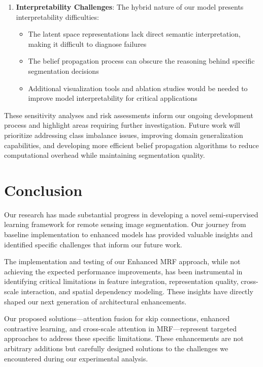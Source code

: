 \documentclass[conference]{IEEEtran}
\begin{document}
\begin{enumerate}
    \item \textbf{Interpretability Challenges}: The hybrid nature of our model presents interpretability difficulties:
    \begin{itemize}
        \item The latent space representations lack direct semantic interpretation, making it difficult to diagnose failures
        \item The belief propagation process can obscure the reasoning behind specific segmentation decisions
        \item Additional visualization tools and ablation studies would be needed to improve model interpretability for critical applications
    \end{itemize}
\end{enumerate}

These sensitivity analyses and risk assessments inform our ongoing development process and highlight areas requiring further investigation. Future work will prioritize addressing class imbalance issues, improving domain generalization capabilities, and developing more efficient belief propagation algorithms to reduce computational overhead while maintaining segmentation quality.

\section*{Conclusion}

Our research has made substantial progress in developing a novel semi-supervised learning framework for remote sensing image segmentation. Our journey from baseline implementation to enhanced models has provided valuable insights and identified specific challenges that inform our future work.

The implementation and testing of our Enhanced MRF approach, while not achieving the expected performance improvements, has been instrumental in identifying critical limitations in feature integration, representation quality, cross-scale interaction, and spatial dependency modeling. These insights have directly shaped our next generation of architectural enhancements.

Our proposed solutions—attention fusion for skip connections, enhanced contrastive learning, and cross-scale attention in MRF—represent targeted approaches to address these specific limitations. These enhancements are not arbitrary additions but carefully designed solutions to the challenges we encountered during our experimental analysis.
\end{document}
